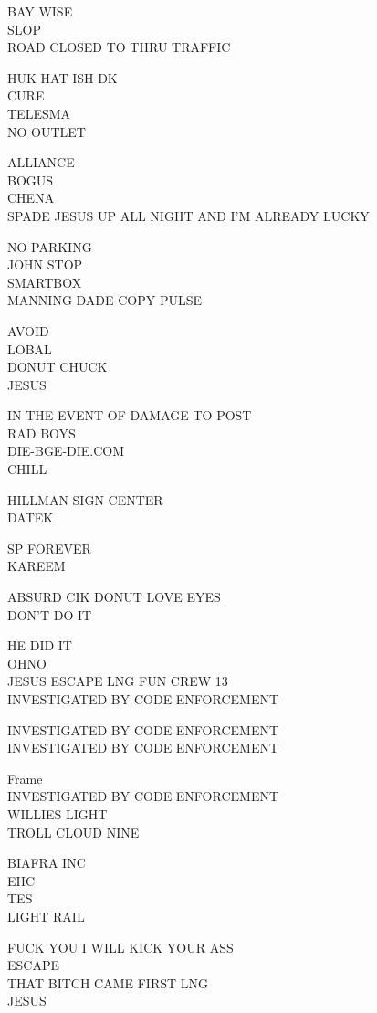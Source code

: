 \documentclass[10pt,letterpaper]{article}
\begin{document}
BAY WISE\\
SLOP\\
ROAD CLOSED TO THRU TRAFFIC

HUK HAT ISH DK\\
CURE\\
TELESMA\\
NO OUTLET

ALLIANCE\\
BOGUS\\
CHENA\\
SPADE JESUS UP ALL NIGHT AND I'M ALREADY LUCKY

NO PARKING\\
JOHN STOP\\
SMARTBOX\\
MANNING DADE COPY PULSE

AVOID\\
LOBAL\\
DONUT CHUCK\\
JESUS

IN THE EVENT OF DAMAGE TO POST\\
RAD BOYS\\
DIE{-}BGE{-}DIE.COM\\
CHILL

HILLMAN SIGN CENTER\\
DATEK

SP FOREVER\\
KAREEM

ABSURD CIK DONUT LOVE EYES\\
DON'T DO IT

HE DID IT\\
OHNO\\
JESUS ESCAPE LNG FUN CREW 13\\
INVESTIGATED BY CODE ENFORCEMENT

INVESTIGATED BY CODE ENFORCEMENT\\
INVESTIGATED BY CODE ENFORCEMENT

Frame\\
INVESTIGATED BY CODE ENFORCEMENT\\
WILLIES LIGHT\\
TROLL CLOUD NINE

BIAFRA INC\\
EHC\\
TES\\
LIGHT RAIL

FUCK YOU I WILL KICK YOUR ASS\\
ESCAPE\\
THAT BITCH CAME FIRST LNG\\
JESUS
\end{document}
